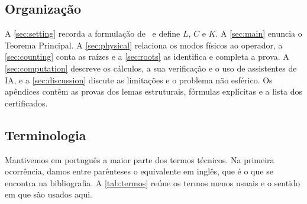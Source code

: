 \subsection{Organização}

A \cref{sec:setting} recorda a formulação de~\cite{RT2019} e define $L$, $C$ e $K$. A \cref{sec:main} enuncia o
Teorema Principal. A \cref{sec:physical} relaciona os modos físicos ao operador, a \cref{sec:counting} conta as raízes e
a \cref{sec:roots} as identifica e completa a prova. A \cref{sec:computation} descreve os cálculos, a sua
verificação e o uso de assistentes de IA, e a \cref{sec:discussion} discute as limitações e o problema não
esférico. Os apêndices contêm as provas dos lemas estruturais, fórmulas explícitas e a lista dos certificados.

\subsection{Terminologia}\label{sec:intro-terms}

Mantivemos em português a maior parte dos termos técnicos. Na primeira ocorrência, damos entre parênteses o
equivalente em inglês, que é o que se encontra na bibliografia. A \cref{tab:termos} reúne os termos menos usuais e o
sentido em que são usados aqui.

